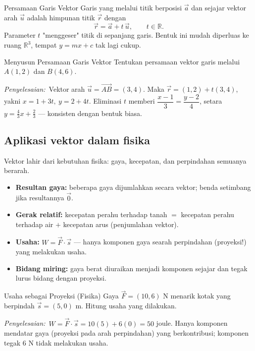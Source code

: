 \documentclass[11pt,a4paper]{report}
\theoremstyle{gaya}
\newcommand{\jawab}{\par\smallskip\noindent\textit{\textcolor{oranye}{Penyelesaian:}}\ }
\begin{document}
\begin{konsep}{Persamaan Garis Vektor}
Garis yang melalui titik berposisi $\vec a$ dan sejajar vektor arah $\vec u$ adalah himpunan titik $\vec r$ dengan
\[
\vec r = \vec a + t\,\vec u,\qquad t\in\mathbb{R}.
\]
Parameter $t$ "menggeser" titik di sepanjang garis. Bentuk ini mudah diperluas ke ruang $\mathbb R^3$, tempat $y=mx+c$ tak lagi cukup.
\end{konsep}

\begin{contoh}{Menyusun Persamaan Garis Vektor}
Tentukan persamaan vektor garis melalui $A(1,2)$ dan $B(4,6)$.

\jawab Vektor arah $\vec u=\vec{AB}=(3,4)$. Maka $\vec r=(1,2)+t(3,4)$, yakni $x=1+3t,\ y=2+4t$. Eliminasi $t$ memberi $\dfrac{x-1}{3}=\dfrac{y-2}{4}$, setara $y=\tfrac43 x+\tfrac23$ --- konsisten dengan bentuk biasa.
\end{contoh}

\subsection*{Aplikasi vektor dalam fisika}
Vektor lahir dari kebutuhan fisika: gaya, kecepatan, dan perpindahan semuanya berarah.

\begin{dunianyata}
\begin{itemize}[leftmargin=*,topsep=2pt]
  \item \textbf{Resultan gaya:} beberapa gaya dijumlahkan secara vektor; benda setimbang jika resultannya $\vec 0$.
  \item \textbf{Gerak relatif:} kecepatan perahu terhadap tanah $=$ kecepatan perahu terhadap air $+$ kecepatan arus (penjumlahan vektor).
  \item \textbf{Usaha:} $W=\vec F\cdot\vec s$ --- hanya komponen gaya searah perpindahan (proyeksi!) yang melakukan usaha.
  \item \textbf{Bidang miring:} gaya berat diuraikan menjadi komponen sejajar dan tegak lurus bidang dengan proyeksi.
\end{itemize}
\end{dunianyata}

\begin{contoh}{Usaha sebagai Proyeksi (Fisika)}
Gaya $\vec F=(10,6)$ N menarik kotak yang berpindah $\vec s=(5,0)$ m. Hitung usaha yang dilakukan.

\jawab $W=\vec F\cdot\vec s=10(5)+6(0)=50$ joule. Hanya komponen mendatar gaya (proyeksi pada arah perpindahan) yang berkontribusi; komponen tegak $6$ N tidak melakukan usaha.
\end{contoh}
\end{document}
